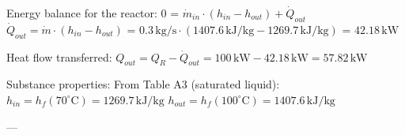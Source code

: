 Energy balance for the reactor:  
0 = \( \dot{m}_{in} \cdot (h_{in} - h_{out}) + \dot{Q}_{out} \)  
\( \dot{Q}_{out} = \dot{m} \cdot (h_{in} - h_{out}) \)  
= \( 0.3 \, \text{kg/s} \cdot (1407.6 \, \text{kJ/kg} - 1269.7 \, \text{kJ/kg}) \)  
= \( 42.18 \, \text{kW} \)  

Heat flow transferred:  
\( Q_{out} = Q_R - \dot{Q}_{out} = 100 \, \text{kW} - 42.18 \, \text{kW} = 57.82 \, \text{kW} \)  

Substance properties:  
From Table A3 (saturated liquid):  
\( h_{in} = h_{f}(70^\circ \text{C}) = 1269.7 \, \text{kJ/kg} \)  
\( h_{out} = h_{f}(100^\circ \text{C}) = 1407.6 \, \text{kJ/kg} \)  

---
